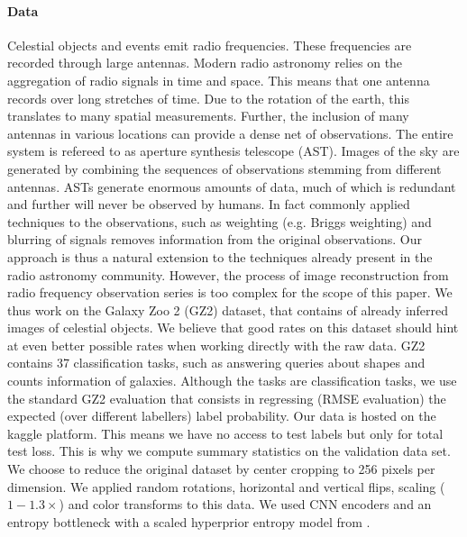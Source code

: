 \documentclass[final]{article}
\begin{document}
 \paragraph{Data}
Celestial objects and events emit radio frequencies. These frequencies are recorded through large antennas. 
Modern radio astronomy relies on the aggregation of radio signals in time and space. This means that one antenna records over long stretches of time. Due to the rotation of the earth, this translates to many spatial measurements. Further, the inclusion of many antennas in various locations can provide a dense net of observations. The entire system is refereed to as aperture synthesis telescope (AST). 
Images of the sky are generated by combining the sequences of observations stemming from different antennas. 
ASTs generate enormous amounts of data, much of which is redundant and further will never be observed by humans.
In fact commonly applied techniques to the observations, such as weighting (e.g. Briggs weighting) and blurring of signals removes information from the original observations. 
Our approach is thus a natural extension to the techniques already present in the radio astronomy community.
However, the process of image reconstruction from radio frequency observation series is too complex for the scope of this paper. 
We thus work on the Galaxy Zoo 2 (GZ2) dataset, that contains of already inferred images of celestial objects. 
We believe that good rates on this dataset should hint at even better possible rates when working directly with the raw data.
GZ2 contains 37 classification tasks, such as answering queries about shapes and counts information of galaxies.
Although the tasks are classification tasks, we use the standard GZ2 evaluation that consists in regressing (RMSE evaluation) the expected (over different labellers) label probability.
Our data is hosted on the kaggle platform.
This means we have no access to test labels but only for total test loss. 
This is why we compute summary statistics on the validation data set.
We choose to reduce the original dataset by center cropping to 256 pixels per dimension.
We applied random rotations, horizontal and vertical flips, scaling ($1-1.3 \times$) and color transforms to this data. 
We used CNN encoders \cite{balle_end--end_2017,minnen_joint_2018} and an entropy bottleneck with a scaled hyperprior entropy model from \cite{balle_variational_2018}.
 
\end{document}
